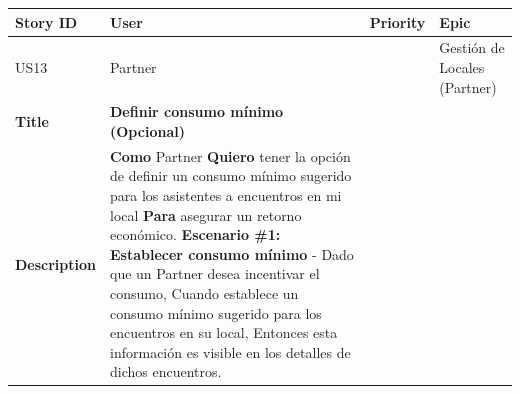 {\def\LTcaptype{none} %
\begin{longtable}[]{@{}
  >{\raggedright\arraybackslash}p{}
  >{\raggedright\arraybackslash}p{}
  >{\raggedright\arraybackslash}p{}
  >{\raggedright\arraybackslash}p{}@{}}
\toprule\noalign{}
\begin{minipage}[b]{\linewidth}\raggedright
Story ID
\end{minipage} & \begin{minipage}[b]{\linewidth}\raggedright
User
\end{minipage} & \begin{minipage}[b]{\linewidth}\raggedright
Priority
\end{minipage} & \begin{minipage}[b]{\linewidth}\raggedright
Epic
\end{minipage} \\
\midrule\noalign{}
\endhead
\bottomrule\noalign{}
\endlastfoot
US13 & Partner & 2 & Gestión de Locales (Partner) \\
\textbf{Title} & \textbf{Definir consumo mínimo (Opcional)} & & \\
\textbf{Description} & \textbf{Como} Partner \textbf{Quiero} tener la
opción de definir un consumo mínimo sugerido para los asistentes a
encuentros en mi local \textbf{Para} asegurar un retorno económico.
\textbf{Escenario \#1: Establecer consumo mínimo} - Dado que un Partner
desea incentivar el consumo, Cuando establece un consumo mínimo sugerido
para los encuentros en su local, Entonces esta información es visible en
los detalles de dichos encuentros. & & \\
\end{longtable}
}

